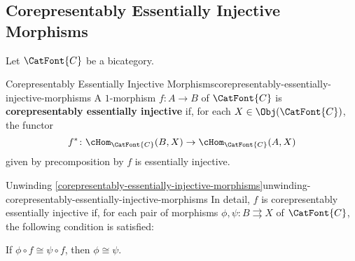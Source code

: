 \subsection{Corepresentably Essentially Injective Morphisms}\label{subsection-corepresentably-essentially-injective-morphisms}
Let $\CatFont{C}$ be a bicategory.
\begin{definition}{Corepresentably Essentially Injective Morphisms}{corepresentably-essentially-injective-morphisms}%
    A $1$-morphism $f\colon A\to B$ of $\CatFont{C}$ is \textbf{corepresentably essentially injective} if, for each $X\in\Obj(\CatFont{C})$, the functor
    \[
        f^{*}%
        \colon%
        \cHom_{\CatFont{C}}(B,X)%
        \to%
        \cHom_{\CatFont{C}}(A,X)%
    \]%
    given by precomposition by $f$ is essentially injective.
\end{definition}
\begin{remark}{Unwinding \cref{corepresentably-essentially-injective-morphisms}}{unwinding-corepresentably-essentially-injective-morphisms}%
    In detail, $f$ is corepresentably essentially injective if, for each pair of morphisms $\phi,\psi\colon B\rightrightarrows X$ of $\CatFont{C}$, the following condition is satisfied:
    \begin{itemize}
        \itemstar If $\phi\circ f\cong\psi\circ f$, then $\phi\cong\psi$.
    \end{itemize}
\end{remark}
